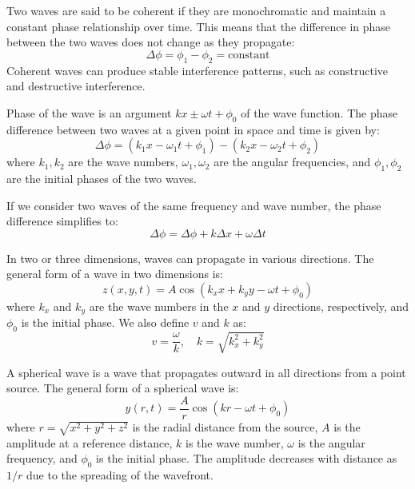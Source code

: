 \documentclass[11pt]{report}
\begin{document}
\begin{definition}[Coherence]
    Two waves are said to be coherent if they are monochromatic and maintain a constant phase relationship over time. This means that the difference in phase between the two waves does not change as they propagate:
    $$
        \Delta \phi = \phi_1 - \phi_2 = \text{constant}
    $$
    Coherent waves can produce stable interference patterns, such as constructive and destructive interference.
\end{definition}

\begin{definition}
    Phase of the wave is an argument $kx \pm \omega t + \phi_0$ of the wave function. The phase difference between two waves at a given point in space and time is given by:
    $$
        \Delta \phi = (k_1 x - \omega_1 t + \phi_1) - (k_2 x - \omega_2 t + \phi_2)
    $$
    where \( k_1, k_2 \) are the wave numbers, \( \omega_1, \omega_2 \) are the angular frequencies, and \( \phi_1, \phi_2 \) are the initial phases of the two waves.

    If we consider two waves of the same frequency and wave number, the phase difference simplifies to:
    $$
        \Delta \phi = \Delta\phi + k\Delta x + \omega \Delta t
    $$

\end{definition}
\begin{definition}
    In two or three dimensions, waves can propagate in various directions. The general form of a wave in two dimensions is:
    $$
        z(x,y,t) = A \cos(k_x x + k_y y - \omega t + \phi_0)
    $$
    where \( k_x \) and \( k_y \) are the wave numbers in the \( x \) and \( y \) directions, respectively, and \( \phi_0 \) is the initial phase. We also define $v$ and $k$ as:
    $$
        v = \frac{\omega}{k}, \quad k = \sqrt{k_x^2 + k_y^2}
    $$
\end{definition}

\begin{definition}
    A spherical wave is a wave that propagates outward in all directions from a point source. The general form of a spherical wave is:
    $$
        y(r,t) = \frac{A}{r} \cos(kr - \omega t + \phi_0)
    $$
    where \( r = \sqrt{x^2 + y^2 + z^2} \) is the radial distance from the source, \( A \) is the amplitude at a reference distance, \( k \) is the wave number, \( \omega \) is the angular frequency, and \( \phi_0 \) is the initial phase. The amplitude decreases with distance as \( 1/r \) due to the spreading of the wavefront.
    
\end{definition}
\end{document}
